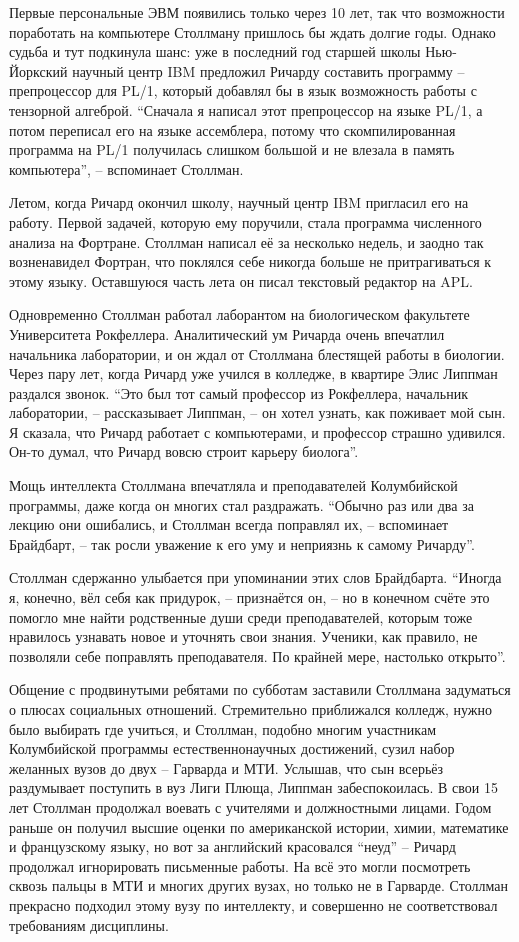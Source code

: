 Первые персональные ЭВМ появились только через 10 лет, так что возможности поработать на компьютере Столлману пришлось бы ждать долгие годы. Однако судьба и тут подкинула шанс: уже в последний год старшей школы Нью-Йоркский научный центр IBM предложил Ричарду составить программу -- препроцессор для PL/1, который добавлял бы в язык возможность работы с тензорной алгеброй. \enquote{Сначала я написал этот препроцессор на языке PL/1, а потом переписал его на языке ассемблера, потому что скомпилированная программа на PL/1 получилась слишком большой и не влезала в память компьютера}, -- вспоминает Столлман.

Летом, когда Ричард окончил школу, научный центр IBM пригласил его на работу. Первой задачей, которую ему поручили, стала программа численного анализа на Фортране. Столлман написал её за несколько недель, и заодно так возненавидел Фортран, что поклялся себе никогда больше не притрагиваться к этому языку. Оставшуюся часть лета он писал текстовый редактор на APL.

Одновременно Столлман работал лаборантом на биологическом факультете Университета Рокфеллера. Аналитический ум Ричарда очень впечатлил начальника лаборатории, и он ждал от Столлмана блестящей работы в биологии. Через пару лет, когда Ричард уже учился в колледже, в квартире Элис Липпман раздался звонок. \enquote{Это был тот самый профессор из Рокфеллера, начальник лаборатории, -- рассказывает Липпман, -- он хотел узнать, как поживает мой сын. Я сказала, что Ричард работает с компьютерами, и профессор страшно удивился. Он-то думал, что Ричард вовсю строит карьеру биолога}.

Мощь интеллекта Столлмана впечатляла и преподавателей Колумбийской программы, даже когда он многих стал раздражать. \enquote{Обычно раз или два за лекцию они ошибались, и Столлман всегда поправлял их, -- вспоминает Брайдбарт, -- так росли уважение к его уму и неприязнь к самому Ричарду}.

Столлман сдержанно улыбается при упоминании этих слов Брайдбарта. \enquote{Иногда я, конечно, вёл себя как придурок, -- признаётся он, -- но в конечном счёте это помогло мне найти родственные души среди преподавателей, которым тоже нравилось узнавать новое и уточнять свои знания. Ученики, как правило, не позволяли себе поправлять преподавателя. По крайней мере, настолько открыто}.

Общение с продвинутыми ребятами по субботам заставили Столлмана задуматься о плюсах социальных отношений. Стремительно приближался колледж, нужно было выбирать где учиться, и Столлман, подобно многим участникам Колумбийской программы естественнонаучных достижений, сузил набор желанных вузов до двух -- Гарварда и МТИ. Услышав, что сын всерьёз раздумывает поступить в вуз Лиги Плюща, Липпман забеспокоилась. В свои 15 лет Столлман продолжал воевать с учителями и должностными лицами. Годом раньше он получил высшие оценки по американской истории, химии, математике и французскому языку, но вот за английский красовался \enquote{неуд} -- Ричард продолжал игнорировать письменные работы. На всё это могли посмотреть сквозь пальцы в МТИ и многих других вузах, но только не в Гарварде. Столлман прекрасно подходил этому вузу по интеллекту, и совершенно не соответствовал требованиям дисциплины.

